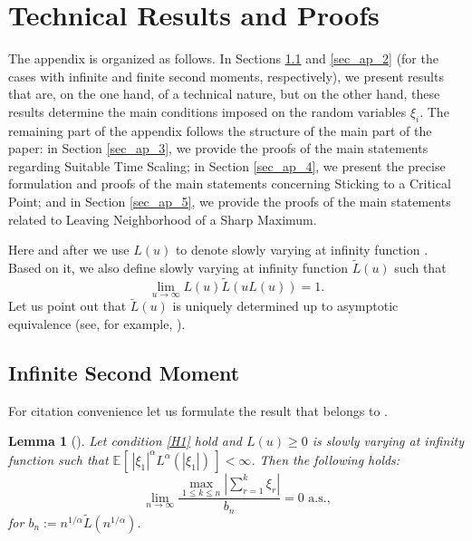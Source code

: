 \documentclass{article}
\theoremstyle{plain}
\newtheorem{lemma}[theorem]{Lemma}
\theoremstyle{definition}
\theoremstyle{remark}
\newcommand{\e}[2][]{{\mathbb{E}_{#1}\left[ \, #2 \,\right] }} %
\newcommand{\beq}{\begin{equation}}
\newcommand{\eeq}{\end{equation}}
\begin{document}




\newpage
\appendix
\onecolumn

\section{Technical Results and Proofs}\label{sec_appendix}

The appendix is organized as follows. In Sections \ref{sec_ap_1} and \ref{sec_ap_2} (for the cases with infinite and finite second moments, respectively), we present results that are, on the one hand, of a technical nature, but on the other hand, these results determine the main conditions imposed on the random variables $\xi_i$. The remaining part of the appendix follows the structure of the main part of the paper: in Section \ref{sec_ap_3}, we provide the proofs of the main statements regarding Suitable Time Scaling; in Section \ref{sec_ap_4}, we present the precise formulation and proofs of the main statements concerning Sticking to a Critical Point; and in Section \ref{sec_ap_5}, we provide the proofs of the main statements related to Leaving Neighborhood of a Sharp Maximum.



Here and after we use $L(u)$ to denote slowly varying at infinity function \cite{bingham1989regular}. Based on it, we also define slowly varying at infinity function $\widetilde{L}(u)$ such that
\beq\label{22.10.2}
\lim\limits_{u\rightarrow\infty}L(u)\widetilde{L}(uL(u))=1.
\eeq
Let us point out that $\widetilde{L}(u)$ is uniquely determined up to asymptotic equivalence
(see, for example, \citet[Theorem 1.5.13]{bingham1989regular}).

\subsection{Infinite Second Moment}\label{sec_ap_1}
For citation convenience let us formulate the result that belongs to \citet[theorem 3.1]{anh2021marcinkiewicz}.
\begin{lemma}[\citet{anh2021marcinkiewicz}] \label{anh2021_t31}
Let condition \ref{H1} hold and $L(u) \geqslant 0$ is slowly varying at infinity function such that $\e{|\xi_1|^\alpha L^\alpha(|\xi_1|)}<\infty$. Then the following holds: 
$$
\lim\limits_{n \to \infty}
\dfrac{\max\limits_{1\leqslant k \leqslant n}\left|\sum\limits_{r=1}^k\xi_r\right|}{b_n}=0 \text{ a.s.,}
$$
for $b_n:=n^{1/\alpha}\widetilde{L}(n^{1/\alpha})$. 
\end{lemma}
\end{document}
